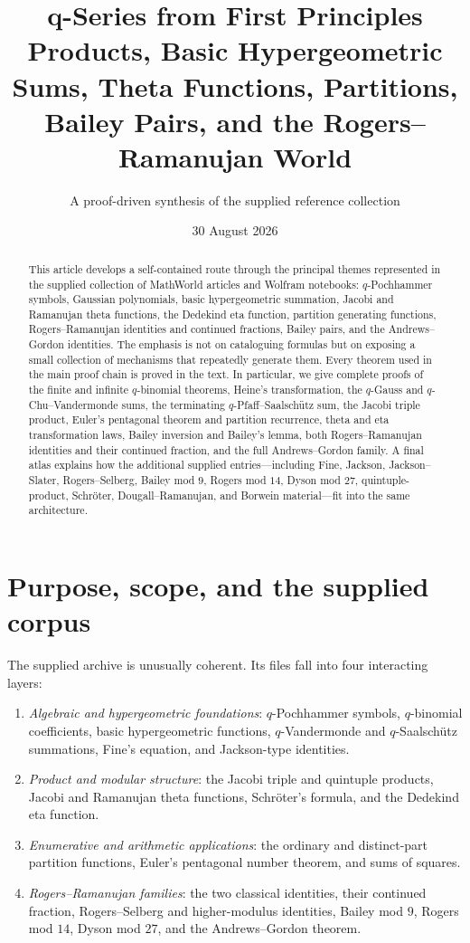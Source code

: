 \documentclass[11pt]{article}
\title{\vspace{-1.5em}\textbf{q-Series from First Principles}\\[0.35em]
\large Products, Basic Hypergeometric Sums, Theta Functions, Partitions,\\
Bailey Pairs, and the Rogers--Ramanujan World}
\author{A proof-driven synthesis of the supplied reference collection}
\date{30 August 2026}
\theoremstyle{blueplain}
\theoremstyle{bluedef}
\begin{document}
\maketitle

\begin{abstract}
This article develops a self-contained route through the principal themes represented in the supplied collection of MathWorld articles and Wolfram notebooks: $q$-Pochhammer symbols, Gaussian polynomials, basic hypergeometric summation, Jacobi and Ramanujan theta functions, the Dedekind eta function, partition generating functions, Rogers--Ramanujan identities and continued fractions, Bailey pairs, and the Andrews--Gordon identities. The emphasis is not on cataloguing formulas but on exposing a small collection of mechanisms that repeatedly generate them. Every theorem used in the main proof chain is proved in the text. In particular, we give complete proofs of the finite and infinite $q$-binomial theorems, Heine's transformation, the $q$-Gauss and $q$-Chu--Vandermonde sums, the terminating $q$-Pfaff--Saalsch\"utz sum, the Jacobi triple product, Euler's pentagonal theorem and partition recurrence, theta and eta transformation laws, Bailey inversion and Bailey's lemma, both Rogers--Ramanujan identities and their continued fraction, and the full Andrews--Gordon family. A final atlas explains how the additional supplied entries---including Fine, Jackson, Jackson--Slater, Rogers--Selberg, Bailey mod $9$, Rogers mod $14$, Dyson mod $27$, quintuple-product, Schr\"oter, Dougall--Ramanujan, and Borwein material---fit into the same architecture.
\end{abstract}

\tableofcontents
\newpage

\section{Purpose, scope, and the supplied corpus}

The supplied archive is unusually coherent. Its files fall into four interacting layers:
\begin{enumerate}[label=\textbf{\arabic*.}]
\item \emph{Algebraic and hypergeometric foundations}: $q$-Pochhammer symbols, $q$-binomial coefficients, basic hypergeometric functions, $q$-Vandermonde and $q$-Saalsch\"utz summations, Fine's equation, and Jackson-type identities.
\item \emph{Product and modular structure}: the Jacobi triple and quintuple products, Jacobi and Ramanujan theta functions, Schr\"oter's formula, and the Dedekind eta function.
\item \emph{Enumerative and arithmetic applications}: the ordinary and distinct-part partition functions, Euler's pentagonal number theorem, and sums of squares.
\item \emph{Rogers--Ramanujan families}: the two classical identities, their continued fraction, Rogers--Selberg and higher-modulus identities, Bailey mod $9$, Rogers mod $14$, Dyson mod $27$, and the Andrews--Gordon theorem.
\end{enumerate}
\end{document}

